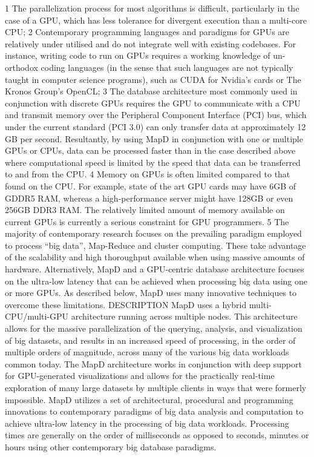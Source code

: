 \documentclass[twocolumn]{article}
\begin{document}
1 The parallelization process for most algorithms is difficult, particularly in the case of a GPU, which has less tolerance for divergent execution than a multi-core CPU;
2 Contemporary programming languages and paradigms for GPUs are relatively under utilised and do not integrate well with existing codebases. For instance, writing code to run on GPUs requires a working knowledge of un-orthodox coding languages (in the sense that such languages are not typically taught in computer science programs), such as CUDA for Nvidia’s cards or The Kronos Group’s OpenCL;
3 The database architecture most commonly used in conjunction with discrete GPUs requires the GPU to communicate with a CPU and transmit memory over the Peripheral Component Interface (PCI) bus, which under the current standard (PCI 3.0) can only transfer data at approximately 12 GB per second. Resultantly, by using MapD in conjunction with one or multiple GPUs or CPUs, data can be processed faster than in the case described above where computational speed is limited by the speed that data can be transferred to and from the CPU.
4 Memory on GPUs is often limited compared to that found on the CPU. For example, state of the art GPU cards may have 6GB of GDDR5 RAM, whereas a high-performance server might have 128GB or even 256GB DDR3 RAM. The relatively limited amount of memory available on current GPUs is currently a serious constraint for GPU programmers.
5 The majority of contemporary research focuses on the prevailing paradigm employed to process “big data”, Map-Reduce and cluster computing. These take advantage of the scalability and high thoroughput available when using massive amounts of hardware. Alternatively, MapD and a GPU-centric database architecture focuses on the ultra-low latency that can be achieved when processing big data using one or more GPUs.
As described below, MapD uses many innovative techniques to overcome these limitations.
DESCRIPTION
MapD uses a hybrid multi-CPU/multi-GPU architecture running across multiple nodes. This architecture allows for the massive parallelization of the querying, analysis, and visualization of big datasets, and results in an increased speed of processing, in the order of multiple orders of magnitude, across many of the various big data workloads common today. The MapD architecture works in conjunction with deep support for GPU-generated visualizations and allows for the practically real-time exploration of many large datasets by
multiple clients in ways that were formerly impossible. MapD utilizes a set of architectural, procedural and programming innovations to contemporary paradigms of big data analysis and computation to achieve ultra-low latency in the processing of big data workloads. Processing times are generally on the order of milliseconds as opposed to seconds, minutes or hours using other contemporary big database paradigms.
\end{document}
